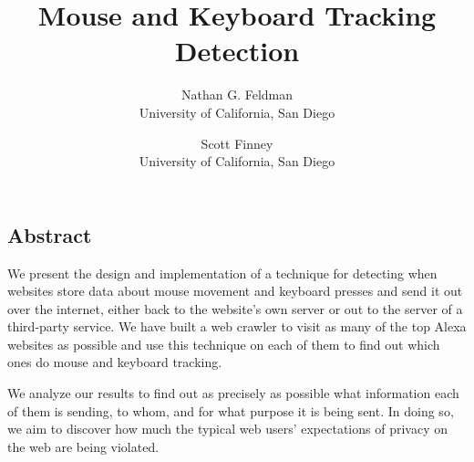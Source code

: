 \documentclass[letterpaper,twocolumn,10pt]{article}
\begin{document}
\date{}

\title{\Large \bf Mouse and Keyboard Tracking Detection}

\author{
{\rm Nathan G. Feldman}\\%
University of California, San Diego
\and
{\rm Scott Finney}\\
University of California, San Diego
} %

\maketitle

\thispagestyle{empty}


\subsection*{Abstract}
We present the design and implementation of a technique for detecting when websites store data about mouse movement and keyboard presses and send it out over the internet, either back to the website's own server or out to the server of a third-party service.  We have built a web crawler to visit as many of the top Alexa websites as possible and use this technique on each of them to find out which ones do mouse and keyboard tracking.

We analyze our results to find out as precisely as possible what information each of them is sending, to whom, and for what purpose it is being sent. In doing so, we aim to discover how much the typical web users' expectations of privacy on the web are being violated.
\end{document}
